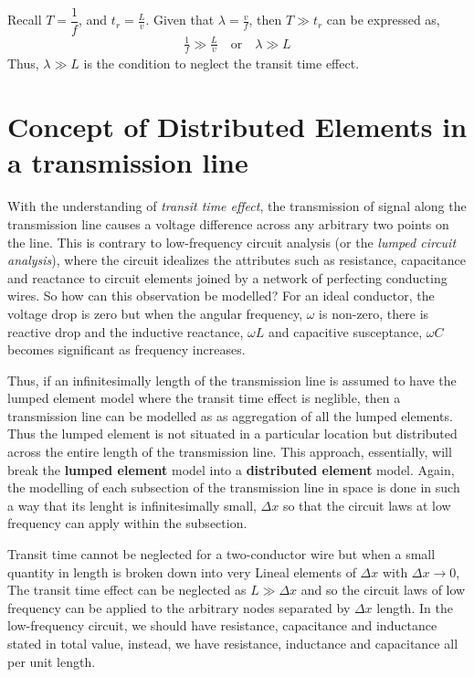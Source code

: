 Recall $T = \dfrac{1}{f} $, and $t_{r} = \frac{L}{v}$. Given that $ \lambda = \frac{v}{f} $, then $T \gg t_r$ can be expressed as, 
\begin{align*}
\frac{1}{f} \gg \frac{L}{v}\quad\text{or}\quad\lambda \gg L
\end{align*}
Thus, $ \lambda \gg L $ is the condition to neglect the transit time effect.


\section{Concept of Distributed Elements in a transmission line}
With the understanding of \textit{transit time effect}, the transmission of signal along the transmission line causes a voltage difference across any arbitrary two points on the line. This is contrary to low-frequency circuit analysis (or the \textit{lumped circuit analysis}), where the circuit idealizes the attributes such as resistance, capacitance and reactance to circuit elements joined by a network of perfecting conducting wires. So how can this observation be modelled? For an ideal conductor, the voltage drop is zero but when the angular frequency, $\omega$ is non-zero, there is reactive drop and the inductive reactance, $\omega L$ and capacitive susceptance, $\omega C$ becomes significant as frequency increases.

Thus, if an infinitesimally length of the transmission line is assumed to have the lumped element model where the transit time effect is neglible, then a transmission line can be modelled as as aggregation of all the lumped elements. Thus the lumped element is not situated in a particular location but distributed across the entire length of the transmission line. This approach, essentially, will break the \textbf{lumped element} model into a \textbf{distributed element} model. Again, the modelling of each subsection of the transmission line in space is done in such a way that its lenght is infinitesimally small, $\Delta x$ so that the circuit laws at low frequency can apply within the subsection.


Transit time cannot be neglected for a two-conductor wire but when a small quantity in length is broken down into very Lineal elements of $ \Delta x $ with  $  \Delta x \rightarrow 0 $, The transit time effect can be neglected as $ L \gg \Delta x $ and so the circuit laws of low frequency can be applied to the arbitrary nodes separated by $ \Delta x $ length. In the low-frequency circuit, we should have resistance, capacitance and inductance stated in total value, instead, we have resistance, inductance and capacitance all per unit length.

